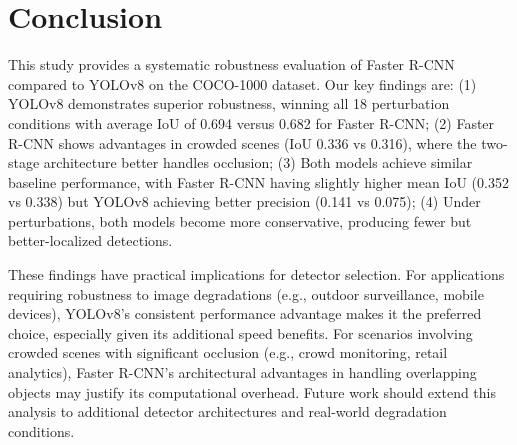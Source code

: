 \documentclass[conference]{IEEEtran}
\begin{document}
\section{Conclusion}

This study provides a systematic robustness evaluation of Faster R-CNN compared to YOLOv8 on the COCO-1000 dataset. Our key findings are: (1) YOLOv8 demonstrates superior robustness, winning all 18 perturbation conditions with average IoU of 0.694 versus 0.682 for Faster R-CNN; (2) Faster R-CNN shows advantages in crowded scenes (IoU 0.336 vs 0.316), where the two-stage architecture better handles occlusion; (3) Both models achieve similar baseline performance, with Faster R-CNN having slightly higher mean IoU (0.352 vs 0.338) but YOLOv8 achieving better precision (0.141 vs 0.075); (4) Under perturbations, both models become more conservative, producing fewer but better-localized detections.

These findings have practical implications for detector selection. For applications requiring robustness to image degradations (e.g., outdoor surveillance, mobile devices), YOLOv8's consistent performance advantage makes it the preferred choice, especially given its additional speed benefits. For scenarios involving crowded scenes with significant occlusion (e.g., crowd monitoring, retail analytics), Faster R-CNN's architectural advantages in handling overlapping objects may justify its computational overhead. Future work should extend this analysis to additional detector architectures and real-world degradation conditions.
\end{document}
